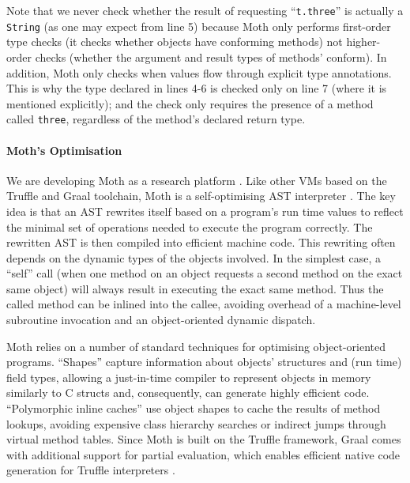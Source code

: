 \documentclass[sigplan,10pt,review,screen]{acmart}\settopmatter{printfolios=true}
\newcommand{\code}[1]{\texttt{#1}}
\newcommand{\RR}[1]{{\color{red}RR: #1}}
\begin{document}
Note that we never check
whether the result of requesting ``\code{t.three}'' is actually
a \code{String} (as one may expect from line 5) because Moth only performs first-order type checks
(it checks whether objects have conforming methods) not higher-order
checks (whether the argument and result types of methods' conform). In addition, Moth
only checks when values flow through explicit type annotations.
This is why the type declared in lines 4-6 is checked only on line 7
(where it is mentioned explicitly); and the check only requires the
presence of a method called \code{three}, regardless of the method's
declared return type.

\paragraph{Moth's Optimisation}
We are developing Moth as a
research platform \cite{roberts-and-co-ecoop-2019}. Like other VMs
based on the Truffle and Graal toolchain, Moth is a self-optimising
AST interpreter \cite{Wurthinger:2012:SelfOptAST}. 
The key idea is that an AST rewrites itself based on a program's run time values
to reflect the minimal set of operations needed to execute the program
correctly. The rewritten AST is then compiled into efficient machine
code. This rewriting often depends on the dynamic types of the
objects involved. In the simplest case, a ``self'' call (when one method
on an object requests a second method on the exact same object) will
always result in executing the exact same method. Thus the called method can be inlined into
the callee, avoiding overhead of a machine-level subroutine
invocation and an object-oriented dynamic dispatch.


Moth relies on a number of standard techniques for optimising
object-oriented programs.
``Shapes'' \citep{woss2014object} capture information about objects'
structures and (run time) 
field types, allowing a just-in-time compiler to
represent objects in memory similarly to C structs and, consequently,
can generate highly efficient code.
``Polymorphic inline caches''
\citep{Hoelzle:91:PIC} use object shapes to cache the results of
method lookups, avoiding expensive class hierarchy searches or
indirect jumps through virtual method tables. 
Since Moth is built on the Truffle framework,
Graal comes with  additional support for partial evaluation,
which enables efficient native code generation for
Truffle interpreters \citep{Wurthinger:2017:PPE}.
\end{document}
